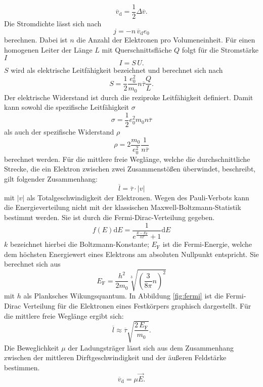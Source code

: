 \begin{equation}
\overline{v}_\mathrm{d} = \frac{1}{2}\Delta \overline{v}.
\end{equation}
Die Stromdichte lässt sich nach
\begin{equation}
  j=-n\,\overline{v}_\mathrm{d} e_0
\end{equation}
berechnen. Dabei ist $n$ die Anzahl der Elektronen pro Volumeneinheit.
Für einen homogenen Leiter der Länge $L$ mit Querschnittsfläche $Q$ folgt für die Stromstärke $I$
\begin{equation}
  I=S\,U.
\end{equation}
$S$ wird als elektrische Leitfähigkeit bezeichnet und berechnet sich nach
\begin{equation}
  \label{eqn:S}
  S=\frac{1}{2}\frac{e_0 ^2}{m_0}n\overline{\tau}\frac{Q}{L}.
\end{equation}
Der elektrische Widerstand ist durch die reziproke Leitfähigkeit definiert. Damit kann sowohl die spezifische Leitfähigkeit $\sigma$
\begin{equation}
  \sigma = \frac{1}{2}{e_0 ^2}{m_0}n\overline{\tau}
\end{equation}
als auch der spezifische Widerstand $\rho$
\begin{equation}
  \rho = 2 \frac{m_0}{e_0 ^2}\frac{1}{n\overline{\tau}}
\end{equation}
berechnet werden.
Für die mittlere freie Weglänge, welche die durchschnittliche Strecke, die ein Elektron zwischen zwei Zusammenstößen überwindet, beschreibt, gilt folgender Zusammenhang:
\begin{equation}
  \overline{l}=\overline{\tau}\cdot|v|
\end{equation}
mit $|v|$ als Totalgeschwindigkeit der Elektronen.
Wegen des Pauli-Verbots kann die Energieverteilung nicht mit der klassischen Maxwell-Boltzmann-Statistik bestimmt werden. Sie ist durch die Fermi-Dirac-Verteilung gegeben.
\begin{equation}
  f(E)\mathrm{d}E= \frac{1}{e^{\frac{E-E_\mathrm{F}}{kT}}+1}\mathrm{d}E
\end{equation}
$k$ bezeichnet hierbei  die Boltzmann-Konstante; $E_\mathrm{F}$ ist die Fermi-Energie, welche dem höchsten Energiewert eines Elektrons am absoluten Nullpunkt entspricht. Sie berechnet sich aus
\begin{equation}
E_\mathrm{F}=\frac{h^2}{2m_0}\sqrt[3]{\left( \frac{3}{8\pi}n\right)^2}
\end{equation}
mit $h$ als Planksches Wikungsquantum.
In Abbildung \ref{fig:fermi} ist die Fermi-Dirac Verteilung für die Elektronen eines Festkörpers graphisch dargestellt.
Für die mittlere freie Weglänge ergibt sich:
\begin{equation}
\overline{l} \approx \overline{\tau}\sqrt{\frac{2\,E_\mathrm{F}}{m_0}}.
\end{equation}
Die Beweglichkeit $\mu$ der Ladungsträger lässt sich aus dem Zusammenhang zwischen der mittleren Dirftgeschwindigkeit und der äußeren Feldstärke bestimmen.
\begin{equation}
\overline{v}_\mathrm{d}=\mu \vec{E}.
\end{equation}

